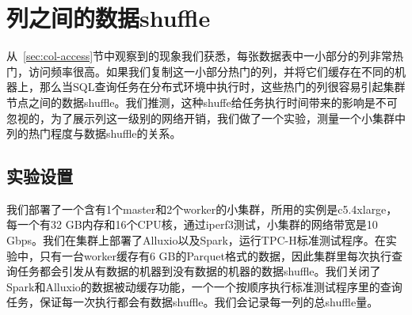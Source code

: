 \section{列之间的数据shuffle}
\label{sec:data-shuffle}

\par 从~\ref{sec:col-access}节中观察到的现象我们获悉，每张数据表中一小部分的列非常热门，访问频率很高。如果我们复制这一小部分热门的列，并将它们缓存在不同的机器上，那么当SQL查询任务在分布式环境中执行时，这些热门的列很容易引起集群节点之间的数据shuffle。我们推测，这种shuffe给任务执行时间带来的影响是不可忽视的，为了展示列这一级别的网络开销，我们做了一个实验，测量一个小集群中列的热门程度与数据shuffle的关系。

\subsection{实验设置}
\label{subsec:data-shuffle-setup}

\par 我们部署了一个含有1个master和2个worker的小集群，所用的实例是c5.4xlarge，每一个有32 GB内存和16个CPU核，通过iperf3测试，小集群的网络带宽是10 Gbps。我们在集群上部署了Alluxio以及Spark，运行TPC-H标准测试程序。在实验中，只有一台worker缓存有6 GB的Parquet格式的数据，因此集群里每次执行查询任务都会引发从有数据的机器到没有数据的机器的数据shuffle。我们关闭了Spark和Alluxio的数据被动缓存功能，一个一个按顺序执行标准测试程序里的查询任务，保证每一次执行都会有数据shuffle。我们会记录每一列的总shuffle量。

